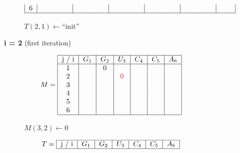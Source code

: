 \begin{figure}[H]
\begin{subfigure}[t]{0.65\textwidth}
\[\begin{tabular}{|c|c|c|c|c|c|c|}
                                    6 & \textcolor{white}{unpaired} & \textcolor{white}{unpaired} & \textcolor{white}{unpaired}
                                    & \textcolor{white}{unpaired}
                                    & \textcolor{white}{unpaired}
                                    & \textcolor{white}{init}
                                    \\ \hline
                        \end{tabular}
        \]
        \caption{$T(2,1) \gets \text{``init''}$ }
    \end{subfigure}
    \caption{\textbf{i = 2} (first iteration)}\label{fig:figure29}

\end{figure}

\begin{figure}[H]
    \centering
    \begin{subfigure}[t]{0.25\textwidth}
        \scriptsize \[
                        M =  \begin{tabular}{|c|c|c|c|c|c|c|}
                                 \hline
                                 j / i & $G_1$ & $G_2$ & $U_3$              & $C_4$ & $C_5$ & $A_6$ \\ \hline
                                 1     &       & 0     &                    &       &       &       \\
                                 2     &       &       & \textcolor{red}{0} &       &       &       \\
                                 3     &       &       &                    &       &       &       \\
                                 4     &       &       &                    &       &       &       \\
                                 5     &       &       &                    &       &       &       \\
                                 6     &       &       &                    &       &       &       \\ \hline
                        \end{tabular}
        \]
        \caption{$M(3,2) \gets 0$}
    \end{subfigure}
    \hfill
    \begin{subfigure}[t]{0.65\textwidth}
        \scriptsize \[
                        T =     \begin{tabular}{|c|c|c|c|c|c|c|}
                                    \hline
                                    j / i & $G_1$ & $G_2$ & $U_3$                 & $C_4$ & $C_5$ & $A_6$ \\ \hline

\end{tabular}\]
\end{subfigure}
\end{figure}
